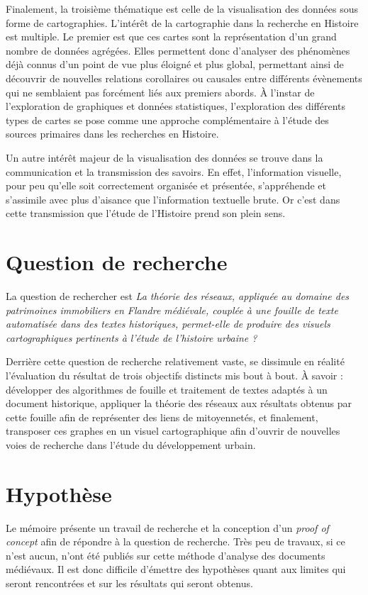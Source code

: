 Finalement, la troisième thématique est celle de la visualisation des données sous forme de cartographies. L’intérêt de la cartographie dans la recherche en Histoire est multiple. Le premier est que ces cartes sont la représentation d’un grand nombre de données agrégées. Elles permettent donc d’analyser des phénomènes déjà connus d’un point de vue plus éloigné et plus global, permettant ainsi de découvrir de nouvelles relations corollaires ou causales entre différents évènements qui ne semblaient pas forcément liés aux premiers abords. À l’instar de l’exploration de graphiques et données statistiques, l’exploration des différents types de cartes se pose comme une approche complémentaire à l’étude des sources primaires dans les recherches en Histoire.

Un autre intérêt majeur de la visualisation des données se trouve dans la communication et la transmission des savoirs. En effet, l’information visuelle, pour peu qu’elle soit correctement organisée et présentée, s’appréhende et s’assimile avec plus d’aisance que l’information textuelle brute. Or c’est dans cette transmission que l’étude de l’Histoire prend son plein sens.

\section{Question de recherche}
 La question de rechercher est \emph{\og La théorie des réseaux, appliquée au domaine des patrimoines immobiliers en Flandre médiévale, couplée à une fouille de texte automatisée dans des textes historiques, permet-elle de produire des visuels cartographiques pertinents à l’étude de l’histoire urbaine ?\fg{}} 
 
 Derrière cette question de recherche relativement vaste, se dissimule en réalité l'évaluation du résultat de trois objectifs distincts mis bout à bout. À savoir : développer des algorithmes de fouille et traitement de textes adaptés à un document historique, appliquer la théorie des réseaux aux résultats obtenus par cette fouille afin de représenter des liens de mitoyennetés, et finalement, transposer ces graphes en un visuel cartographique afin d'ouvrir de nouvelles voies de recherche dans l'étude du développement urbain.
 
\section{Hypothèse}
Le mémoire présente un travail de recherche et la conception d'un \textit{proof of concept} afin de répondre à la question de recherche. Très peu de travaux, si ce n'est aucun, n'ont été publiés sur cette méthode d'analyse des documents médiévaux. Il est donc difficile d'émettre des hypothèses quant aux limites qui seront rencontrées et sur les résultats qui seront obtenus.

